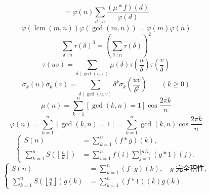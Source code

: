 \begin{footnotesize}
\[    =\varphi(n)\sum_{d\mid n}\frac{(\mu*f)(d)}{\varphi(d)}\]
\[\varphi(\operatorname{lcm}(m,n))\varphi(\gcd(m,n))
    =\varphi(m)\varphi(n)\]
\[\sum_{\delta\mid n}\tau(\delta)^3
    =\left(\sum_{\delta\mid n}\tau(\delta)\right)^2\]
\[\tau(uv)=\sum_{\delta\mid\gcd(u,v)}\mu(\delta)
    \tau\left(\frac u\delta\right)\tau\left(\frac v\delta\right)\]
\[\sigma_k(u)\sigma_k(v)=\sum_{\delta\mid\gcd(u,v)}\delta^k
    \sigma_k\left(\frac{uv}{\delta^2}\right)\qquad(k\ge0)\]
\[\mu(n)=\sum_{k=1}^n[\gcd(k,n)=1]\cos\frac{2\pi k}n\]
\[\varphi(n)=\sum_{k=1}^n[\gcd(k,n)=1]
    =\sum_{k=1}^n\gcd(k,n)\cos\frac{2\pi k}n\]
\[
\left\{
\begin{aligned}
S(n)&=\sum_{k=1}^n(f*g)(k),\\
\sum_{k=1}^nS\left(\left\lfloor\frac nk\right\rfloor\right)
    &=\sum_{i=1}^nf(i)\sum_{j=1}^{\lfloor n/i\rfloor}(g*1)(j).
\end{aligned}
\right.
\]
\[
\left\{
\begin{aligned}
S(n)&=\sum_{k=1}^n(f\cdot g)(k),\quad g\text{ 完全积性},\\
\sum_{k=1}^nS\left(\left\lfloor\frac nk\right\rfloor\right)g(k)
    &=\sum_{k=1}^n(f*1)(k)g(k).
\end{aligned}
\right.
\]

\end{footnotesize}
